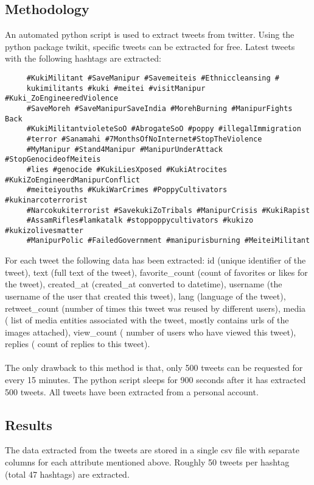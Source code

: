 \documentclass{report}
\begin{document}
\subsection{Methodology}
An automated python script is used to extract tweets from twitter. Using the python package twikit, specific tweets can be extracted for free. Latest tweets with the following hashtags are extracted: 
\begin{verbatim}
     #KukiMilitant #SaveManipur #Savemeiteis #Ethniccleansing #
     kukimilitants #kuki #meitei #visitManipur #Kuki_ZoEngineeredViolence 
     #SaveMoreh #SaveManipurSaveIndia #MorehBurning #ManipurFights Back 
     #KukiMilitantvioleteSoO #AbrogateSoO #poppy #illegalImmigration 
     #terror #Sanamahi #7MonthsOfNoInternet#StopTheViolence 
     #MyManipur #Stand4Manipur #ManipurUnderAttack #StopGenocideofMeiteis 
     #lies #genocide #KukiLiesXposed #KukiAtrocites #KukiZoEngineerdManipurConflict 
     #meiteiyouths #KukiWarCrimes #PoppyCultivators #kukinarcoterrorist 
     #Narcokukiterrorist #SavekukiZoTribals #ManipurCrisis #KukiRapist 
     #AssamRifles#lamkatalk #stoppoppycultivators #kukizo #kukizolivesmatter 
     #ManipurPolic #FailedGovernment #manipurisburning #MeiteiMilitant 
\end{verbatim}
For each tweet the following data has been extracted: id (unique identifier of the tweet), text (full text of the tweet), favorite\_count (count of favorites or likes for the tweet), created\_at (created\_at converted to datetime), username (the username of the user that created this tweet), lang (language of the tweet), retweet\_count (number of times this tweet was reused by different users), media ( list of media entities associated with the tweet, mostly contains urls of the images attached), view\_count ( number of users who have viewed this tweet), replies ( count of replies to this tweet).
\paragraph{}The only drawback to this method is that, only 500 tweets can be requested for every 15 minutes. The python script sleeps for 900 seconds after it has extracted 500 tweets. All tweets have been extracted from a personal account.
\subsection{Results}
The data extracted from the tweets are stored in a single csv file with separate columns for each attribute mentioned above. Roughly 50 tweets per hashtag (total 47 hashtags) are extracted.
\end{document}
